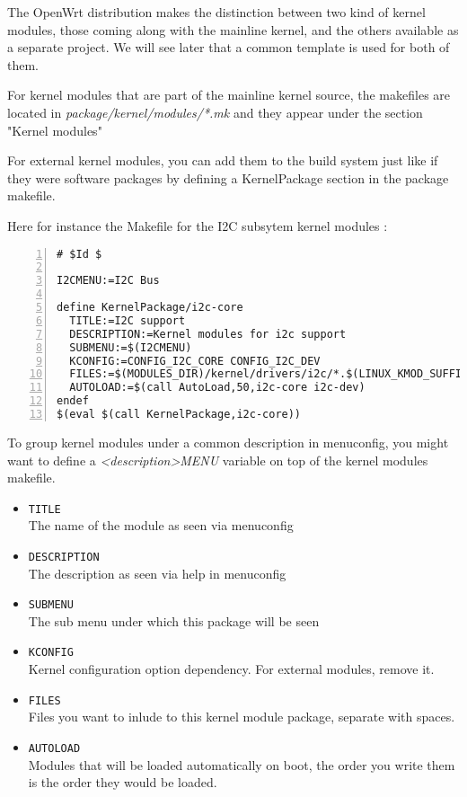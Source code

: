 The OpenWrt distribution makes the distinction between two kind of kernel modules, those coming along with the mainline kernel, and the others available as a separate project. We will see later that a common template is used for both of them.

For kernel modules that are part of the mainline kernel source, the makefiles are located in \textit{package/kernel/modules/*.mk} and they appear under the section "Kernel modules"

For external kernel modules, you can add them to the build system just like if they were software packages by defining a KernelPackage section in the package makefile.

Here for instance the Makefile for the I2C subsytem kernel modules :

\begin{Verbatim}[frame=single,numbers=left]
# $Id $

I2CMENU:=I2C Bus

define KernelPackage/i2c-core
  TITLE:=I2C support
  DESCRIPTION:=Kernel modules for i2c support
  SUBMENU:=$(I2CMENU)
  KCONFIG:=CONFIG_I2C_CORE CONFIG_I2C_DEV
  FILES:=$(MODULES_DIR)/kernel/drivers/i2c/*.$(LINUX_KMOD_SUFFIX)
  AUTOLOAD:=$(call AutoLoad,50,i2c-core i2c-dev)
endef
$(eval $(call KernelPackage,i2c-core))
\end{Verbatim}

To group kernel modules under a common description in menuconfig, you might want to define a \textit{<description>MENU} variable on top of the kernel modules makefile.

\begin{itemize}
    \item \texttt{TITLE} \\
        The name of the module as seen via menuconfig
    \item \texttt{DESCRIPTION} \\
        The description as seen via help in menuconfig
    \item \texttt{SUBMENU} \\
        The sub menu under which this package will be seen
    \item \texttt{KCONFIG} \\
        Kernel configuration option dependency. For external modules, remove it.
    \item \texttt{FILES} \\
        Files you want to inlude to this kernel module package, separate with spaces.
    \item \texttt{AUTOLOAD} \\
        Modules that will be loaded automatically on boot, the order you write them is the order they would be loaded.
\end{itemize}

